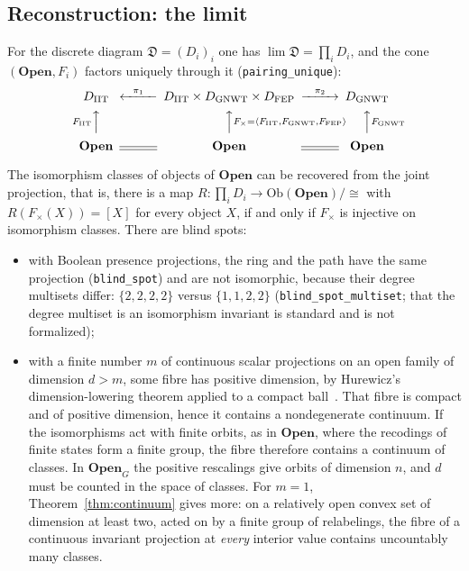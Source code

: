 \subsection{Reconstruction: the limit}\label{sec:limite}
For the discrete diagram $\mathfrak D=(D_i)_i$ one has $\lim\mathfrak D=\prod_iD_i$, and the cone $(\mathbf{Open},F_i)$ factors uniquely through it (\texttt{pairing\_unique}):
\begin{equation}
\begin{CD}
D_{\rm IIT} @<{\pi_1}<< D_{\rm IIT}\times D_{\rm GNWT}\times D_{\rm FEP} @>{\pi_2}>> D_{\rm GNWT}\\
@A{F_{\rm IIT}}AA @AA{F_\times=\langle F_{\rm IIT},F_{\rm GNWT},F_{\rm FEP}\rangle}A @AA{F_{\rm GNWT}}A\\
\mathbf{Open} @= \mathbf{Open} @= \mathbf{Open}
\end{CD}
\end{equation}
\begin{theorem}\label{thm:reconstruccion}
The isomorphism classes of objects of $\mathbf{Open}$ can be recovered from the joint projection, that is, there is a map $R:\prod_iD_i\to\mathrm{Ob}(\mathbf{Open})/{\cong}$ with $R(F_\times(X))=[X]$ for every object $X$, if and only if $F_\times$ is injective on isomorphism classes. There are blind spots:
\begin{itemize}
\item[(i)] with Boolean presence projections, the ring and the path have the same projection (\texttt{blind\_spot}) and are not isomorphic, because their degree multisets differ: $\{2,2,2,2\}$ versus $\{1,1,2,2\}$ (\texttt{blind\_spot\_multiset}; that the degree multiset is an isomorphism invariant is standard and is not formalized);
\item[(ii)] with a finite number $m$ of continuous scalar projections on an open family of dimension $d>m$, some fibre has positive dimension, by Hurewicz's dimension-lowering theorem applied to a compact ball~\cite[Theorem~VI\,7]{HurewiczWallman1941}. That fibre is compact and of positive dimension, hence it contains a nondegenerate continuum. If the isomorphisms act with finite orbits, as in $\mathbf{Open}$, where the recodings of finite states form a finite group, the fibre therefore contains a continuum of classes. In $\mathbf{Open}_G$ the positive rescalings give orbits of dimension $n$, and $d$ must be counted in the space of classes. For $m=1$, Theorem~\ref{thm:continuum} gives more: on a relatively open convex set of dimension at least two, acted on by a finite group of relabelings, the fibre of a continuous invariant projection at \emph{every} interior value contains uncountably many classes.
\end{itemize}
\end{theorem}

